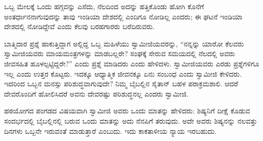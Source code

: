ಒಬ್ಬ ಮೇಲಕ್ಕೆ ಒಂದು ಹಗ್ಗವನ್ನು ಎಸೆದು, ನೆಲದಿಂದ ಅದನ್ನು ಹತ್ತಿಕೊಂಡು ಹೋಗಿ ಕೊನೆಗೆ ಅಂತರ್ಧಾನನಾಗುವುದನ್ನು ತಾವು ಇಂಡಿಯಾ ದೇಶದಲ್ಲಿ ಎಂದಿಗೂ ನೋಡಿಲ್ಲ ಎಂದರು; ಈ ಘಟನೆ ಇಂಡಿಯಾ ದೇಶದಲ್ಲಿ ನೋಡಿದ್ದೇವೆ ಎಂದು ಕೆಲವು ಬರಹಗಾರರು ಬರೆದಿರುವರು.

ಬಾತ್ಮಿದಾರ ಪ್ರಶ್ನೆ ಹಾಕುತ್ತಿದ್ದಾಗ ಅಲ್ಲಿದ್ದ ಒಬ್ಬ ಮಹಿಳೆಯು ಸ್ವಾಮೀಜಿಯವರನ್ನು, “ನನ್ನನ್ನು ಯಾರೋ ಕೆಲವರು ಸ್ವಾಮೀಜಿಯವರು ಮಾಯಮಂತ್ರಗಳನ್ನು ಮಾಡಬಲ್ಲರೇ? ಸಂಘಕ್ಕೆ ಸೇರುವ ಸಮಯದಲ್ಲಿ ನೆಲದಲ್ಲಿ ಅವರು ಜೀವಸಹಿತ ಹೂಳಲ್ಪಟ್ಟಿದ್ದರೇ?” ಎಂದು ಪ್ರಶ್ನೆ ಮಾಡಿದರು ಎಂದು ಹೇಳಿದಳು. ಸ್ವಾಮೀಜಿಯವರು ಎರಡು ಪ್ರಶ್ನೆಗಳಿಗೂ ಇಲ್ಲ ಎಂದು ಉತ್ತರ ಕೊಟ್ಟರು. ಇದಕ್ಕೂ ಆಧ್ಯಾತ್ಮಿಕ ಜೀವನಕ್ಕೂ ಏನು ಸಂಬಂಧ ಎಂದು ಸ್ವಾಮೀಜಿ ಕೇಳಿದರು. ಇದರಿಂದ ಒಬ್ಬನ ಮನಸ್ಸು ಪರಿಶುದ್ಧವಾಗುವುದೇ? ನಿಮ್ಮ ಬೈಬಲ್ಲಿನ ಸೈತಾನ್​ ಬಹಳ ಪರಾಕ್ರಮಶಾಲಿ. ಆದರೆ ದೇವರೊಂದಿಗೆ ಹೋಲಿಸಿದರೆ ಅವನು ದೇವರಷ್ಟು ಪರಿಶುದ್ಧನಲ್ಲ ಎಂದರು ಸ್ವಾಮೀಜಿ.

ಹಠಯೋಗದ ಪಂಗಡದ ವಿಷಯವಾಗಿ ಸ್ವಾಮೀಜಿ ಅವರು ಒಂದು ಮಾತನ್ನು ಹೇಳಿದರು: ಶಿಷ್ಯನಿಗೆ ದೀಕ್ಷೆ ಕೊಡುವ ಸಂದರ್ಭದಲ್ಲಿ ಬೈಬಲ್ಲಿನಲ್ಲಿ ಬರುವ ಒಂದು ಮಾತನ್ನು ಅದು ನೆನಪಿಗೆ ತರುವುದು. ಅದೇ ಅವರು ಶಿಷ್ಯನನ್ನು ನಲವತ್ತು ದಿನಗಳು ಒಬ್ಬನೇ ಇರುವಂತೆ ಮಾಡುತ್ತಾರೆ ಎಂಬುದು. ಇದು ಕಾಕತಾಳೀಯ ನ್ಯಾಯ ಇರಬಹುದು.

